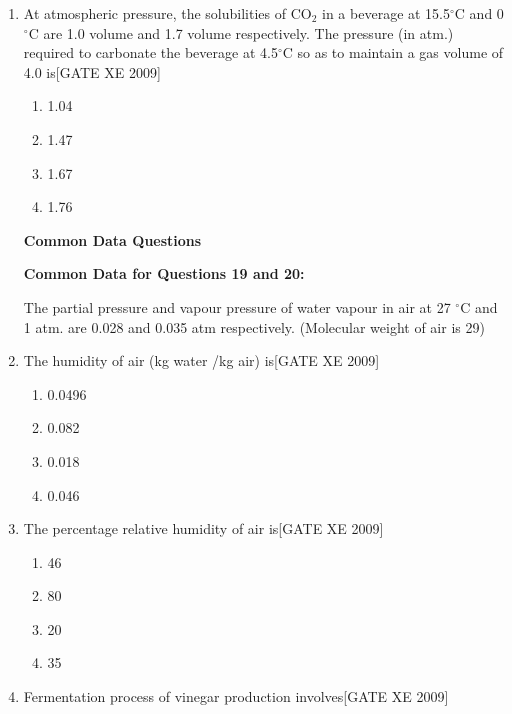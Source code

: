 \documentclass[journal,12pt,onecolumn]{IEEEtran}
\theoremstyle{remark}
\begin{document}
\begin{enumerate}
\begin{enumerate}
\begin{enumerate}[label=\textbf{Q.\arabic*.}, wide=0pt, leftmargin=*]
\item At atmospheric pressure, the solubilities of CO$_2$ in a beverage at 15.5$^\circ$C and 0$^\circ$C are 1.0 volume and 1.7 volume respectively. The pressure (in atm.) required to carbonate the beverage at 4.5$^\circ$C so as to maintain a gas volume of 4.0 is\hfill[GATE XE 2009]

\begin{multicols}{2}
\begin{enumerate}
\item 1.04
\item 1.47
\item 1.67
\item 1.76
\end{enumerate}
\end{multicols}

\vspace{1em}
\noindent\textbf{Common Data Questions}

\noindent\textbf{Common Data for Questions 19 and 20:}

\vspace{0.5em}
The partial pressure and vapour pressure of water vapour in air at 27 $^\circ$C and 1 atm. are 0.028 and 0.035 atm respectively. (Molecular weight of air is 29)

\item The humidity of air (kg water /kg air) is\hfill[GATE XE 2009]

\begin{multicols}{2}
\begin{enumerate}
\item 0.0496
\item 0.082
\item 0.018
\item 0.046
\end{enumerate}
\end{multicols}

\item The percentage relative humidity of air is\hfill[GATE XE 2009]

\begin{multicols}{2}
\begin{enumerate}
\item 46
\item 80
\item 20
\item 35
\end{enumerate}
\end{multicols}

\item Fermentation process of vinegar production involves\hfill[GATE XE 2009]


\end{enumerate}
\end{enumerate}
\end{enumerate}
\end{document}
